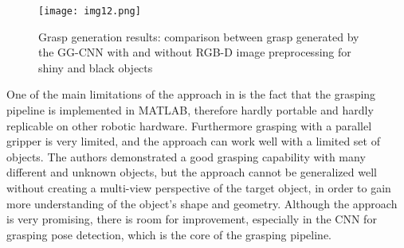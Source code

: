 \begin{figure}[H]
	\centering
	\texttt{[image: img12.png]}
	\captionsetup{width=1\linewidth}
	\caption{Grasp generation results: comparison between grasp generated by the GG-CNN
	with and without RGB-D image preprocessing for shiny and black objects
	\cite{sayour2022unknowngrasping}}
	\label{fig:img12}
\end{figure}

One of the main limitations of the approach in \cite{sayour2022unknowngrasping} is the fact 
that the grasping pipeline is implemented in MATLAB, therefore hardly portable and hardly
replicable on other robotic hardware. Furthermore grasping with a parallel gripper is
very limited, and the approach can work well with a limited set of objects. The authors
demonstrated a good grasping capability with many different and unknown objects, but
the approach cannot be generalized well without creating a multi-view perspective of 
the target object, in order to gain more understanding of the object's shape and
geometry. Although the approach is very promising, there is room for improvement,
especially in the CNN for grasping pose detection, which is the core of the grasping pipeline.


